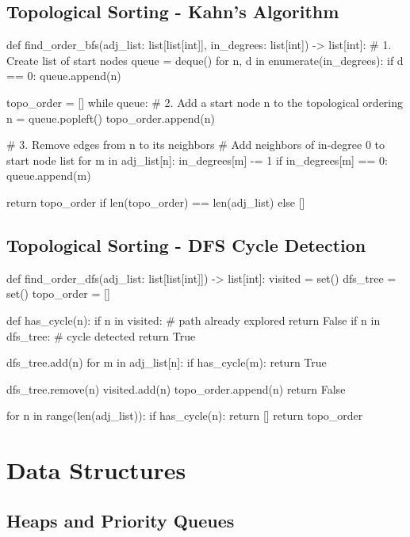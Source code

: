 \documentclass[12pt, titlepage]{article}
\begin{document}
\subsection{Topological Sorting - Kahn's Algorithm} \label{kahn}
\begin{python}
def find_order_bfs(adj_list: list[list[int]],
                   in_degrees: list[int]) -> list[int]:
    # 1. Create list of start nodes
    queue = deque()
    for n, d in enumerate(in_degrees):
        if d == 0:
            queue.append(n)

    topo_order = []
    while queue:
        # 2. Add a start node n to the topological ordering
        n = queue.popleft()
        topo_order.append(n)

        # 3. Remove edges from n to its neighbors
        #    Add neighbors of in-degree 0 to start node list
        for m in adj_list[n]:
            in_degrees[m] -= 1
            if in_degrees[m] == 0:
                queue.append(m)

    return topo_order if len(topo_order) == len(adj_list) else []
\end{python}

\subsection{Topological Sorting - DFS Cycle Detection} \label{dfs-topo}
\begin{python}
def find_order_dfs(adj_list: list[list[int]]) -> list[int]:
    visited = set()
    dfs_tree = set()
    topo_order = []

    def has_cycle(n):
        if n in visited:  # path already explored
            return False
        if n in dfs_tree:  # cycle detected
            return True

        dfs_tree.add(n)
        for m in adj_list[n]:
            if has_cycle(m):
                return True

        dfs_tree.remove(n)
        visited.add(n)
        topo_order.append(n)
        return False

    for n in range(len(adj_list)):
        if has_cycle(n):
            return []
    return topo_order
\end{python}

\section{Data Structures}

\subsection{Heaps and Priority Queues} \label{heap}
\end{document}
